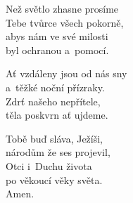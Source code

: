 \begin{translatioMulticol}{3}
Než světlo zhasne prosíme\\
Tebe tvůrce všech pokorně,\\
abys nám ve své milosti\\
byl ochranou a~pomocí.\columnbreak

Ať vzdáleny jsou od nás sny\\
a~těžké noční přízraky.\\
Zdrť našeho nepřítele,\\
těla poskvrn ať ujdeme.\columnbreak

Tobě buď sláva, Ježíši,\\
národům že ses projevil,\\
Otci i~Duchu života\\
po věkoucí věky světa.\\
Amen.
\end{translatioMulticol}
